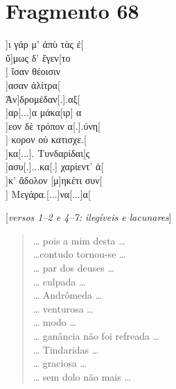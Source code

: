 \pagebreak
\section{Fragmento 68} 

\begin{gkverse}
]ι γάρ μ’ ἀπὺ τὰς ἐ[\\
ὔ]μως δ’ ἔγεν[το\\
   ] ἴσαν θέοισιν\\
 ]ασαν ἀλίτρα[\\
        Ἀν]δρομέδαν[.].αξ[\\
   ]αρ[...]α μάκα[ιρ] α\\
 ]εον δὲ τρόπον α[.].ύνη[\\
      ] κορον οὐ κατισχε.[\\
]κα[...]. Τυνδαρίδαι[ς\\
]ασυ[.]...κα[.] χαρίεντ’ ἀ[\\
]κ’ ἄδολον [μ]ηκέτι συν[\\
] Μεγάρα.[...]να[...]α[

\textnormal{[\textit{versos 1--2 e 4--7: ilegíveis e lacunares}]}

\end{gkverse}

\begin{verse}
\ldots{} pois a mim desta \ldots{}\\
\ldots{}contudo tornou-se \ldots{}\\
\ldots{} par dos deuses \ldots{}\\
\ldots{} culpada \ldots{}\\
\ldots{} Andrômeda \ldots{}\\
\ldots{} venturosa \ldots{}\\
\ldots{} modo \ldots{}\\
\ldots{} ganância não foi refreada \ldots{}\\
\ldots{} Tindaridas \ldots{}\\
\ldots{} graciosa \ldots{}\\
\ldots{} sem dolo não mais \ldots{}
\end{verse}

